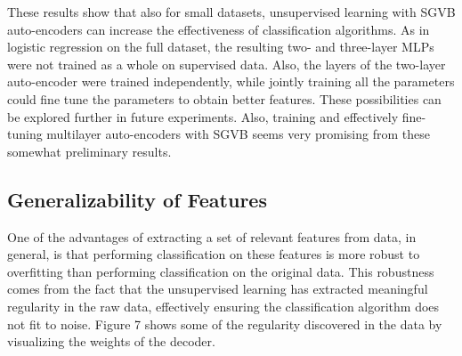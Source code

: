 \documentclass{article}
\begin{document}
These results show that also for small datasets, unsupervised learning with SGVB auto-encoders can increase the effectiveness of classification algorithms. As in logistic regression on the full dataset, the resulting two- and three-layer MLPs were not trained as a whole on supervised data. Also, the layers of the two-layer auto-encoder were trained independently, while jointly training all the parameters could fine tune the parameters to obtain better features. These possibilities can be explored further in future experiments. Also, training and effectively fine-tuning multilayer auto-encoders with SGVB seems very promising from these somewhat preliminary results. 

\subsection{Generalizability of Features}
One of the advantages of extracting a set of relevant features from data, in general, is that performing classification on these features is more robust to overfitting than performing classification on the original data. This robustness comes from the fact that the unsupervised learning has extracted meaningful regularity in the raw data, effectively ensuring the classification algorithm does not fit to noise. Figure 7 shows some of the regularity discovered in the data by visualizing the weights of the decoder.
\end{document}
